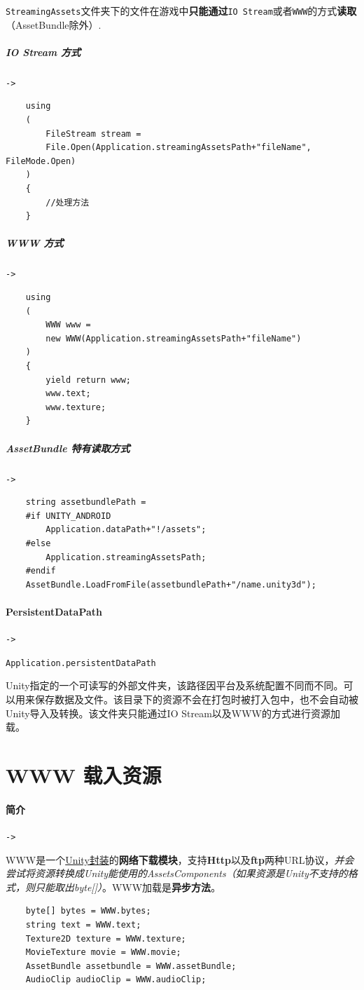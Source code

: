 \documentclass[UTF8,a4paper,12pt]{ctexbook}
\begin{document}
				\verb|StreamingAssets|文件夹下的文件在游戏中\textbf{只能通过}\verb|IO Stream|或者\verb|WWW|的方式\textbf{读取}（AssetBundle除外）.
				\subparagraph{IO Stream 方式}\verb|->|
					\begin{lstlisting}
	using
	(
		FileStream stream = 
		File.Open(Application.streamingAssetsPath+"fileName", FileMode.Open)
	) 
	{ 
		//处理方法 
	} 
					\end{lstlisting}
				
				\subparagraph{WWW 方式}\verb|->|
					\begin{lstlisting}
	using
	(
		WWW www = 
		new WWW(Application.streamingAssetsPath+"fileName")
	) 
	{ 
		yield return www; 
		www.text; 
		www.texture; 
	} 
					\end{lstlisting}
				
				\subparagraph{AssetBundle 特有读取方式}\verb|->|
					\begin{lstlisting}
	string assetbundlePath = 
	#if UNITY_ANDROID 
		Application.dataPath+"!/assets"; 
	#else 
		Application.streamingAssetsPath; 
	#endif  
	AssetBundle.LoadFromFile(assetbundlePath+"/name.unity3d"); 
					\end{lstlisting}
					
			\paragraph{PersistentDataPath}\verb|->|
			
				\verb|Application.persistentDataPath |
				
				Unity指定的一个可读写的外部文件夹，该路径因平台及系统配置不同而不同。可以用来保存数据及文件。该目录下的资源不会在打包时被打入包中，也不会自动被Unity导入及转换。该文件夹只能通过IO Stream以及WWW的方式进行资源加载。
			
	\section{WWW 载入资源}
		\paragraph{简介}\verb|->|
			
			 WWW是一个\underline{Unity封装}的\textbf{网络下载模块}，支持\textbf{Http}以及\textbf{ftp}两种URL协议，\textit{并会尝试将资源转换成Unity能使用的AssetsComponents（如果资源是Unity不支持的格式，则只能取出byte[]）}。WWW加载是\textbf{异步方法}。
				\begin{lstlisting}
	byte[] bytes = WWW.bytes; 
	string text = WWW.text; 
	Texture2D texture = WWW.texture; 
	MovieTexture movie = WWW.movie; 
	AssetBundle assetbundle = WWW.assetBundle; 
	AudioClip audioClip = WWW.audioClip; 
				\end{lstlisting}
			
\end{document}
